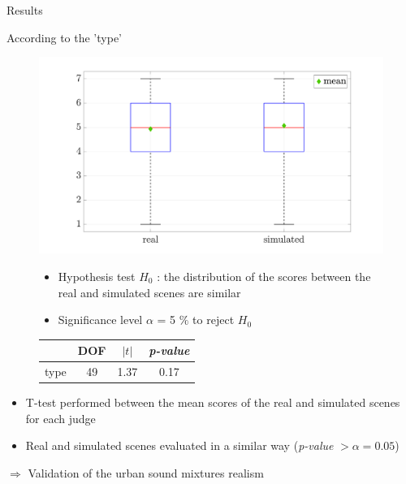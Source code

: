 \documentclass{beamer}
\begin{document}
\begin{frame}{Results}

\begin{block}{According to the 'type'}

\begin{figure}

\begin{flushleft}
\begin{minipage}[l]{.5\linewidth}
\includegraphics[width=\textwidth]{pictures/testPerceptif_boxplotType_EN.pdf}
\end{minipage}
\hspace{0.1cm}
\begin{minipage}[r]{.4\linewidth}
\begin{itemize}
\footnotesize
	\item Hypothesis test $H_0$ : the distribution of the scores between the real and simulated scenes are similar
	\item Significance level $\alpha$ = 5 $\%$ to reject $H_0$
\end{itemize}

\footnotesize
\begin{tabular}{lccc}
	& DOF & $\vert t \vert$    & \textit{p-value} \\ 
\hline
type & 49 & 1.37 & 0.17    \\
\hline 
\end{tabular}
\label{blablatab}
\end{minipage}

\end{flushleft}

\end{figure}
\end{block}

\begin{itemize}
\footnotesize
	\item T-test performed between the mean scores of the real and simulated scenes for each judge
	\item Real and simulated scenes evaluated in a similar way (\textit{p-value} $> \alpha = 0.05$)\\
\end{itemize}

$\Rightarrow$ Validation of the urban sound mixtures realism


\end{frame}
\end{document}
